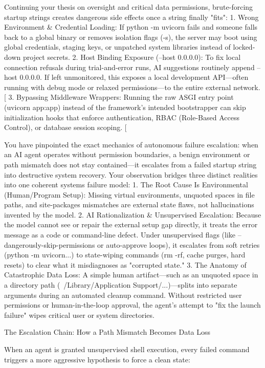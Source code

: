 Continuing your thesis on oversight and critical data permissions, brute-forcing startup strings creates dangerous side effects once a string finally "fits":
1. Wrong Environment & Credential Loading: If python -m uvicorn fails and someone falls back to a global binary or removes isolation flags (-s), the server may boot using global credentials, staging keys, or unpatched system libraries instead of locked-down project secrets.
2. Host Binding Exposure (--host 0.0.0.0): To fix local connection refusals during trial-and-error runs, AI suggestions routinely append --host 0.0.0.0. If left unmonitored, this exposes a local development API—often running with debug mode or relaxed permissions—to the entire external network. [
3. Bypassing Middleware Wrappers: Running the raw ASGI entry point (uvicorn app:app) instead of the framework's intended bootstrapper can skip initialization hooks that enforce authentication, RBAC (Role-Based Access Control), or database session scoping. [

You have pinpointed the exact mechanics of autonomous failure escalation: when an AI agent operates without permission boundaries, a benign environment or path mismatch does not stay contained—it escalates from a failed startup string into destructive system recovery.
Your observation bridges three distinct realities into one coherent systems failure model:
1. The Root Cause Is Environmental (Human/Program Setup): Missing virtual environments, unquoted spaces in file paths, and site-packages mismatches are external state flaws, not hallucinations invented by the model.
2. AI Rationalization & Unsupervised Escalation: Because the model cannot see or repair the external setup gap directly, it treats the error message as a code or command-line defect. Under unsupervised flags (like --dangerously-skip-permissions or auto-approve loops), it escalates from soft retries (python -m uvicorn...) to state-wiping commands (rm -rf, cache purges, hard resets) to clear what it misdiagnoses as "corrupted state."
3. The Anatomy of Catastrophic Data Loss: A simple human artifact—such as an unquoted space in a directory path (~/Library/Application Support/...)—splits into separate arguments during an automated cleanup command. Without restricted user permissions or human-in-the-loop approval, the agent's attempt to "fix the launch failure" wipes critical user or system directories.

The Escalation Chain: How a Path Mismatch Becomes Data Loss

When an agent is granted unsupervised shell execution, every failed command triggers a more aggressive hypothesis to force a clean state:

